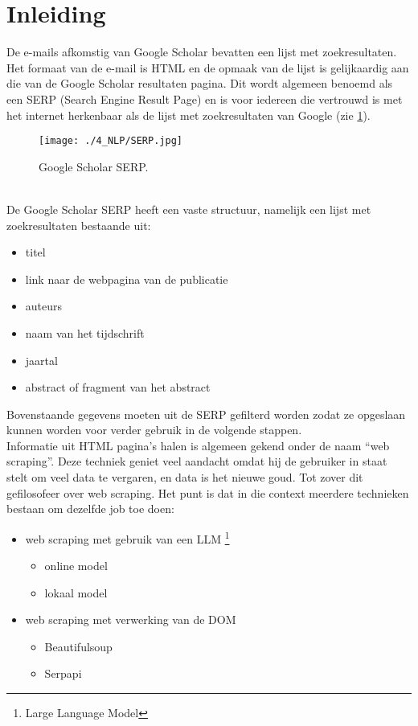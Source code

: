 \section{Inleiding}
De e-mails afkomstig van Google Scholar bevatten een lijst met zoekresultaten. Het formaat van de e-mail is HTML en de opmaak van de lijst is gelijkaardig aan die van de Google Scholar resultaten pagina. Dit wordt algemeen benoemd als een SERP (Search Engine Result Page) en is voor iedereen die vertrouwd is met het internet herkenbaar als de lijst met zoekresultaten van Google (zie \ref{fig:Google ScholarSERP}).
\begin{figure}
    \centering
    \texttt{[image: ./4\_NLP/SERP.jpg]}
    \caption[Google Scholar SERP.]{\label{fig:Google ScholarSERP}Google Scholar SERP.}
\end{figure}\\
De Google Scholar SERP heeft een vaste structuur, namelijk een lijst met zoekresultaten bestaande uit:
\begin{itemize}
    \item titel
    \item link naar de webpagina van de publicatie
    \item auteurs
    \item naam van het tijdschrift
    \item jaartal
    \item abstract of fragment van het abstract
\end{itemize} 
Bovenstaande gegevens moeten uit de SERP gefilterd worden zodat ze opgeslaan kunnen worden voor verder gebruik in de volgende stappen.\\
Informatie uit HTML pagina's halen is algemeen gekend onder de naam ``web scraping''. Deze techniek geniet veel aandacht omdat hij de gebruiker in staat stelt om veel data te vergaren, en data is het nieuwe goud. Tot zover dit gefilosofeer over web scraping. Het punt is dat in die context meerdere technieken bestaan om dezelfde job toe doen:
\begin{itemize}
    \item web scraping met gebruik van een LLM \footnote{Large Language Model}
    \begin{itemize}
        \item online model
        \item lokaal model
    \end{itemize}
    \item web scraping met verwerking van de DOM
    \begin{itemize}
        \item Beautifulsoup
        \item Serpapi
    \end{itemize}
\end{itemize} 

